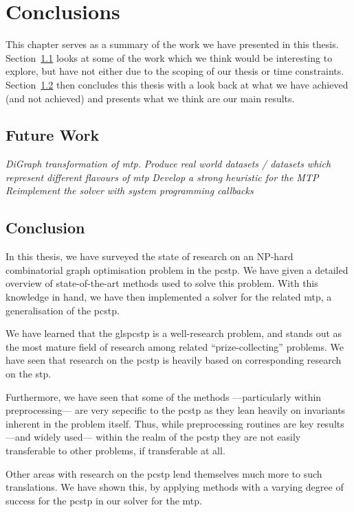 \makeatletter
\def\toclevel@chapter{-1}
\makeatother
\chapter{Conclusions}
This chapter serves as a summary of the work we have presented in this thesis.
Section~\ref{sec:con:fut} looks at some of the work which we think would be
interesting to explore, but have not either due to the scoping of our thesis or
time constraints.
Section~\ref{sec:con:con} then concludes this thesis with a look back at what we
have achieved (and not achieved) and presents what we think are our main results.
\section{Future Work}\label{sec:con:fut}
\textit{DiGraph transformation of \gls{mtp}.}
\textit{Produce real world datasets / datasets which represent different flavours of mtp}
\textit{Develop a strong heuristic for the MTP}
\textit{Reimplement the solver with system programming callbacks}

\section{Conclusion}\label{sec:con:con}
In this thesis, we have surveyed the state of research on
an NP-hard combinatorial graph optimisation problem in
the \acrlong{pcstp}. We have given a detailed overview of state-of-the-art
methods used to solve this problem.
With this knowledge in hand, we have then implemented a solver for the related
\acrlong{mtp}, a generalisation of the \gls{pcstp}.

We have learned that the gls{pcstp}
is a well-research problem, and stands out as the most mature field of
research among related ``prize-collecting'' problems.
We have seen that research on the \gls{pcstp} is heavily based on corresponding
research on the \gls{stp}.

Furthermore, we have seen that some of the methods
---particularly within preprocessing---
are very sepecific to the \gls{pcstp} as they lean heavily on
invariants inherent in the problem itself. Thus, while preprocessing routines
are key results ---and widely used--- within the realm of the \gls{pcstp}
they are not easily transferable to other problems, if transferable at all.

Other areas with research on the \gls{pcstp} lend themselves much more to such
translations. We have shown this, by applying methods
with a varying degree of success for the
\gls{pcstp} in our solver for the \gls{mtp}.

